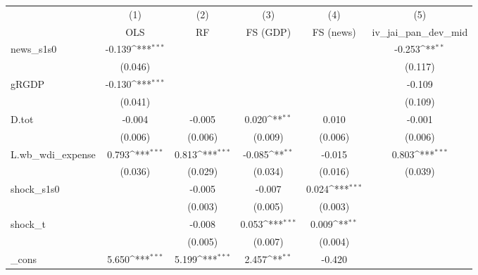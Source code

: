 {
\def\sym#1{\ifmmode^{#1}\else\(^{#1}\)\fi}
\begin{tabular}{l*{5}{c}}
\toprule
            &\multicolumn{1}{c}{(1)}&\multicolumn{1}{c}{(2)}&\multicolumn{1}{c}{(3)}&\multicolumn{1}{c}{(4)}&\multicolumn{1}{c}{(5)}\\
            &\multicolumn{1}{c}{OLS}&\multicolumn{1}{c}{RF}&\multicolumn{1}{c}{FS (GDP)}&\multicolumn{1}{c}{FS (news)}&\multicolumn{1}{c}{iv\_jai\_pan\_dev\_mid}\\
\midrule
news\_s1s0   &      -0.139\sym{***}&                     &                     &                     &      -0.253\sym{**} \\
            &     (0.046)         &                     &                     &                     &     (0.117)         \\
\addlinespace
gRGDP       &      -0.130\sym{***}&                     &                     &                     &      -0.109         \\
            &     (0.041)         &                     &                     &                     &     (0.109)         \\
\addlinespace
D.tot       &      -0.004         &      -0.005         &       0.020\sym{**} &       0.010         &      -0.001         \\
            &     (0.006)         &     (0.006)         &     (0.009)         &     (0.006)         &     (0.006)         \\
\addlinespace
L.wb\_wdi\_expense&       0.793\sym{***}&       0.813\sym{***}&      -0.085\sym{**} &      -0.015         &       0.803\sym{***}\\
            &     (0.036)         &     (0.029)         &     (0.034)         &     (0.016)         &     (0.039)         \\
\addlinespace
shock\_s1s0  &                     &      -0.005         &      -0.007         &       0.024\sym{***}&                     \\
            &                     &     (0.003)         &     (0.005)         &     (0.003)         &                     \\
\addlinespace
shock\_t     &                     &      -0.008         &       0.053\sym{***}&       0.009\sym{**} &                     \\
            &                     &     (0.005)         &     (0.007)         &     (0.004)         &                     \\
\addlinespace
\_cons      &       5.650\sym{***}&       5.199\sym{***}&       2.457\sym{**} &      -0.420         &                     \\

\end{tabular}}
